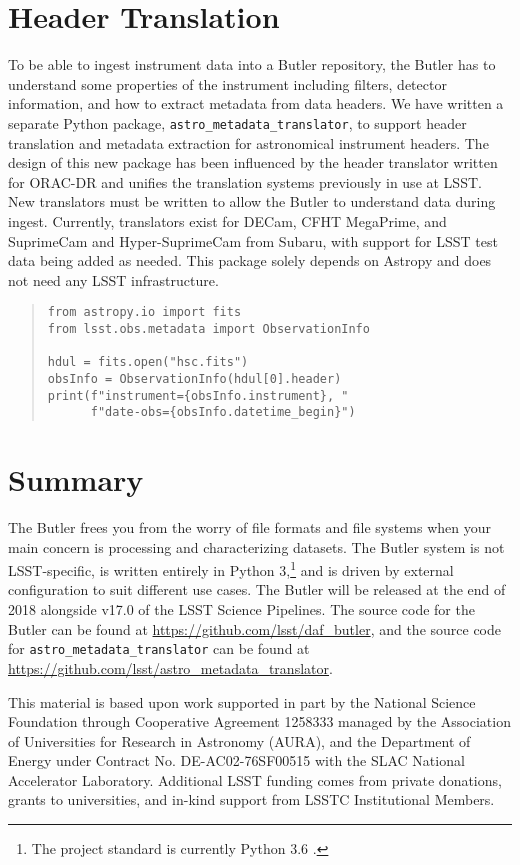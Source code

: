 \documentclass[11pt,twoside]{article}
\begin{document}
\section{Header Translation}

To be able to ingest instrument data into a Butler repository, the Butler has to understand some properties of the instrument including filters, detector information, and how to extract metadata from data headers.
We have written a separate Python package, \texttt{astro\_metadata\_translator}, to support header translation and metadata extraction for astronomical instrument headers.
The design of this new package has been influenced by the header translator written for ORAC-DR \citep{2015A&C.....9...40J} and unifies the translation systems previously in use at LSST.
New translators must be written to allow the Butler to understand data during ingest.
Currently, translators exist for DECam, CFHT MegaPrime, and SuprimeCam and Hyper-SuprimeCam from Subaru, with support for LSST test data being added as needed.
This package solely depends on Astropy \citep{2018AJ....156..123A} and does not need any LSST infrastructure.

\begin{quote}
\begin{small}
\begin{verbatim}
from astropy.io import fits
from lsst.obs.metadata import ObservationInfo

hdul = fits.open("hsc.fits")
obsInfo = ObservationInfo(hdul[0].header)
print(f"instrument={obsInfo.instrument}, "
      f"date-obs={obsInfo.datetime_begin}")
\end{verbatim}
\end{small}
\end{quote}

\section{Summary}

The Butler frees you from the worry of file formats and file systems when your main concern is processing and characterizing datasets.
The Butler system is not LSST-specific, is written entirely in Python 3,\footnote{The project standard is currently Python 3.6 \citep{P9-123_adassxxvii}.} and is driven by external configuration to suit different use cases.
The Butler will be released at the end of 2018 alongside v17.0 of the LSST Science Pipelines.
The source code for the Butler can be found at \url{https://github.com/lsst/daf_butler}, and the source code for \texttt{astro\_metadata\_translator} can be found at \url{https://github.com/lsst/astro_metadata_translator}.


\acknowledgements This material is based upon work supported in part by the National Science Foundation through Cooperative Agreement 1258333 managed by the Association of Universities for Research in Astronomy (AURA), and the Department of Energy under Contract No. DE-AC02-76SF00515 with the SLAC National Accelerator Laboratory.
Additional LSST funding comes from private donations, grants to universities, and in-kind support from LSSTC Institutional Members.

\end{document}
